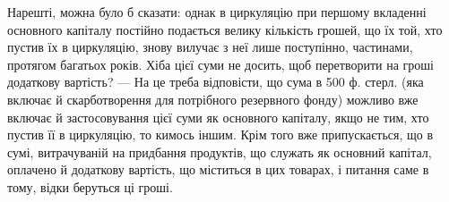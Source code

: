 Нарешті, можна було б сказати: однак в циркуляцію при першому
вкладенні основного капіталу постійно подається велику кількість грошей,
що їх той, хто пустив їх в циркуляцію, знову вилучає з неї лише поступінно,
частинами, протягом багатьох років. Хіба цієї суми не досить,
щоб перетворити на гроші додаткову вартість? — На це треба відповісти,
що сума в 500 ф. стерл. (яка включає й скарботворення для потрібного
резервного фонду) можливо вже включає й застосовування цієї суми як
основного капіталу, якщо не тим, хто пустив її в циркуляцію, то кимось
іншим. Крім того вже припускається, що в сумі, витрачуваній на
придбання продуктів, що служать як основний капітал, оплачено й додаткову
вартість, що міститься в цих товарах, і питання саме в тому, відки
беруться ці гроші.
